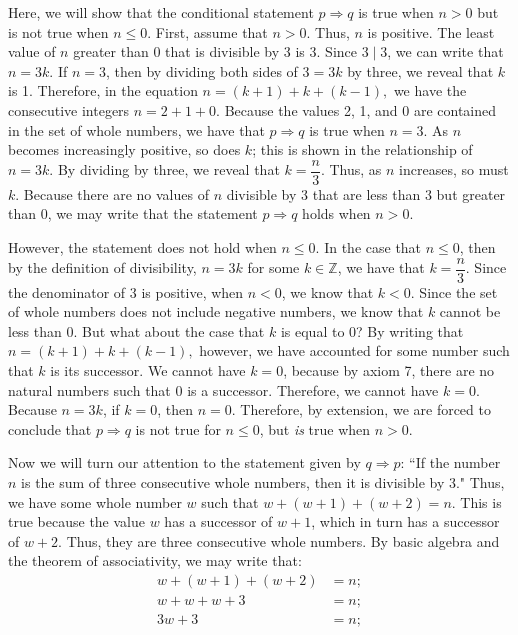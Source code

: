 \documentclass[12pt]{exam}
\begin{document}
\begin{questions}
\par
Here, we will show that the conditional statement $p \Rightarrow q$ is true when $n>0$ but is not true when $n\leq0$. First, assume that $n>0$. Thus, $n$ is positive. The least value of $n$ greater than $0$ that is divisible by 3 is 3. Since $3 \mid 3$, we can write that $n = 3k$. If $n = 3$, then by dividing both sides of $3 = 3k$ by three, we reveal that $k$ is 1. Therefore, in the equation $n = (k+1) + k + (k-1),$ we have the consecutive integers $n = 2 +1 +0$. Because the values 2, 1, and 0 are contained in the set of whole numbers, we have that $p \Rightarrow q$ is true when $n=3$. As $n$ becomes increasingly positive, so does $k$; this is shown in the relationship of $n =3k$. By dividing by three, we reveal that $k = \dfrac{n}{3}$. Thus, as $n$ increases, so must $k$. Because there are no values of $n$ divisible by 3 that are less than 3 but greater than 0, we may write that the statement $p \Rightarrow q$ holds when $n>0$.
\par
However, the statement does not hold when $n\leq 0$. In the case that $n \leq0$, then by the definition of divisibility, $n = 3k$ for some $k \in \mathbb Z$, we have that $k = \dfrac{n}{3}$. Since the denominator of 3 is positive, when $n < 0$, we know that $k< 0$. Since the set of whole numbers does not include negative numbers, we know that $k$ cannot be less than 0. But what about the case that $k$ is equal to $0$? By writing that $n = (k+1) + k + (k-1),$ however, we have accounted for some number such that $k$ is its successor. We cannot have $k=0$, because by axiom 7, there are no natural numbers such that 0 is a successor. Therefore, we cannot have $k=0$. Because $n = 3k$, if $k=0$, then $n=0$. Therefore, by extension, we are forced to conclude that $p \Rightarrow q$ is not true for $n \leq 0$, but \textit{is} true when $n >0$.
\par
 Now we will turn our attention to the statement given by $q \Rightarrow p$: ``If the number $n$ is the sum of three consecutive whole numbers, then it is divisible by 3." Thus, we have some whole number $w$ such that $w + (w+1) + (w+2) = n$. This is true because the value $w$ has a successor of $w+1$, which in turn has a successor of $w+2$. Thus, they are three consecutive whole numbers. By basic algebra and the theorem of associativity, we may write that:
 \begin{align*}
 w + (w+1) + (w+2) &= n; \\
 w+w+w+3 &= n ;\\
3w+3 &= n;\\

\end{align*}
\end{questions}
\end{document}
